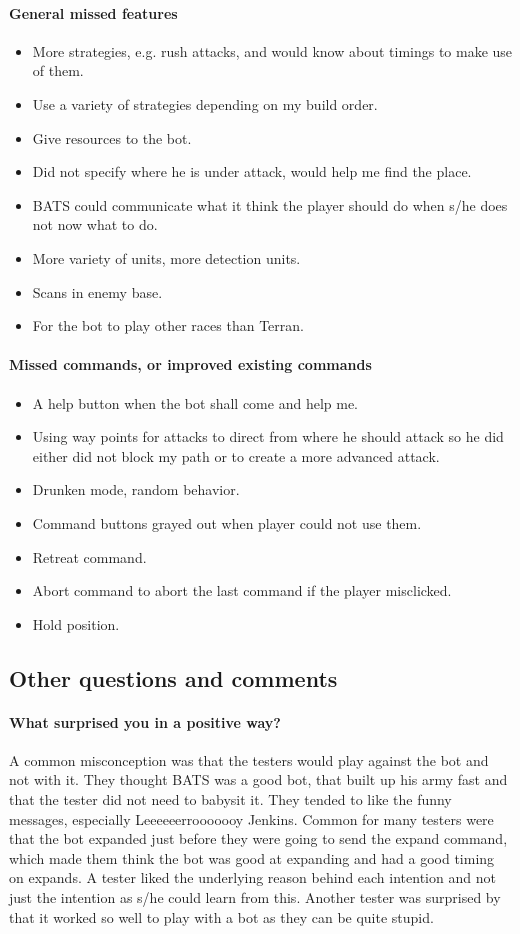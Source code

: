 \paragraph{General missed features}
\begin{itemize}
	\item More strategies, e.g. rush attacks, and would know about timings to make use of them.
	\item Use a variety of strategies depending on my build order.
	\item Give resources to the bot.
	\item Did not specify where he is under attack, would help me find the place.
	\item BATS could communicate what it think the player should do when s/he does not now what to do.
	\item More variety of units, more detection units.
	\item Scans in enemy base.
	\item For the bot to play other races than Terran.
\end{itemize}

\paragraph{Missed commands, or improved existing commands}
\begin{itemize}
	\item A help button when the bot shall come and help me.
	\item Using way points for attacks to direct from where he should attack so he did either did not block my path or to create a more advanced attack.
	\item Drunken mode, random behavior.
	\item Command buttons grayed out when player could not use them.
	\item Retreat command.
	\item Abort command to abort the last command if the player misclicked.
	\item Hold position.
\end{itemize}

\subsection{Other questions and comments}
\paragraph{What surprised you in a positive way?}
A common misconception was that the testers would play against the bot and not with it. They thought BATS was a good bot, that built up his army fast and that the tester did not need to babysit it. They tended to like the funny messages, especially Leeeeeerrooooooy Jenkins. Common for many testers were that the bot expanded just before they were going to send the expand command, which made them think the bot was good at expanding and had a good timing on expands. A tester liked the underlying reason behind each intention and not just the intention as s/he could learn from this. Another tester was surprised by that it worked so well to play with a bot as they can be quite stupid.

